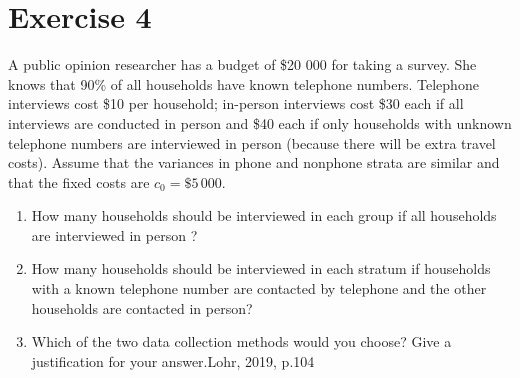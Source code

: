 \documentclass[12pt]{article}
\begin{document}
\section*{Exercise 4}
A public opinion researcher has a budget of \$20 000 for taking a survey. She knows that 90\% of all households have known telephone numbers. Telephone interviews cost \$10 per household; in-person interviews cost \$30 each if all interviews are conducted in person and \$40 each if only households with unknown telephone numbers are interviewed in person (because there will be extra travel costs). Assume that the variances in phone and nonphone strata are similar and that the fixed costs are $c_0 = \$5\,000$.   
\begin{enumerate}
\item How many households should be interviewed in each group if all households are interviewed in person ?
\item How many households should be interviewed in each stratum if households with a known telephone number are contacted by telephone and the other households are contacted in person?
\item Which of the two data collection methods would you choose? Give a justification for your answer.\hfill{Lohr, 2019, p.104}
\end{enumerate}
\end{document}
